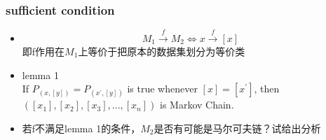 \documentclass[a4paper, 11pt]{article} %
\begin{document}
\begin{small}
\subsubsection{sufficient condition}
\begin{itemize}
	\item 
	$$
	M_1 \xrightarrow{f} M_2 \Longleftrightarrow x\xrightarrow{f} [x] 
	$$
	即f作用在$M_1$上等价于把原本的数据集划分为等价类
	\item lemma 1\\
	If $P_{(x,[y])}=P_{(x^{'},[y])}$ is true whenever $[x]=[x^{'}]$, then $([x_1],[x_2],[x_3],...,[x_n])$ is Markov Chain.
	\item 
	若f不满足lemma 1的条件，$M_2$是否有可能是马尔可夫链？试给出分析
\end{itemize}


\end{small}
\end{document}
